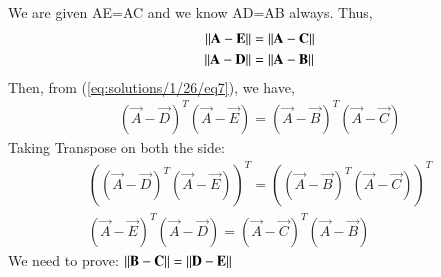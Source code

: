 We are given AE=AC and we know AD=AB always. Thus, 
\begin{align}
    \left\lVert\mathbf{A}-\mathbf{E}\right\rVert  &=  \left\lVert\mathbf{A}-\mathbf{C}\right\rVert\label{eq:solutions/1/26/eq8}\\
    \left\lVert\mathbf{A}-\mathbf{D}\right\rVert  &=  \left\lVert\mathbf{A}-\mathbf{B}\right\rVert\label{eq:solutions/1/26/eq9}
\end{align}
Then, from (\ref{eq:solutions/1/26/eq7}), we have,
\begin{align}
(\vec A -\vec D)^T(\vec{A}-\vec{E}) =  (\vec A -\vec B)^T(\vec{A}-\vec{C})\label{eq:solutions/1/26/eq10}
\end{align}
Taking Transpose on both the side:
\begin{align}
((\vec A -\vec D)^T(\vec{A}-\vec{E}))^T =  ((\vec A -\vec B)^T(\vec{A}-\vec{C}))^T\label{eq:solutions/1/26/eq11}\\
(\vec A -\vec E)^T(\vec{A}-\vec{D}) =  (\vec A -\vec C)^T(\vec{A}-\vec{B})\label{eq:solutions/1/26/eq12}
\end{align}
We need to prove: $\left\lVert\mathbf{B} - \mathbf{C}\right\rVert = \left\lVert\mathbf{D} - \mathbf{E}\right\rVert$ 
